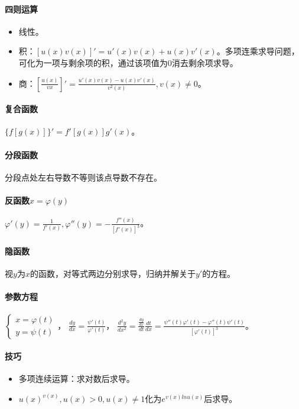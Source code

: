 \documentclass[
12pt, %
a4paper, 
oneside, %
headinclude,footinclude, %
]{scrartcl}
\begin{document}
\paragraph{四则运算}
\begin{itemize}
\item 线性。
\item 积：$ [u(x)v(x)]' = u'(x)v(x) + u(x)v'(x) $。多项连乘求导问题，
可化为一项与剩余项的积，通过该项值为$ 0 $消去剩余项求导。
\item 商：$ [\frac{u(x)}{v{x}}]' = \frac{u'(x)v(x) - u(x)v'(x)}{v^2(x)}, v(x) \neq 0 $。
\end{itemize}
\paragraph{复合函数}
$ \{f[g(x)]\}' = f'[g(x)]g'(x) $。
\paragraph{分段函数}
分段点处左右导数不等则该点导数不存在。
\paragraph{反函数$ x = \varphi (y) $}
$ \varphi '(y) = \frac{1}{f'(x)}, \varphi''(y) = -\frac{f''(x)}{[f'(x)]^3} $。
\paragraph{隐函数}
视$ y $为$ x $的函数，对等式两边分别求导，归纳并解关于$ y' $的方程。
\paragraph{参数方程}
$
\begin{cases}
x = \varphi (t) \\
y = \psi (t)
\end{cases}
$，
$ \frac{dy}{dx} = \frac{\psi' (t)}{\varphi' (t)} $，
$ \frac{d^2y}{dx^2} = \frac{\frac{dy}{dx}}{dt} \frac{dt}{dx} = \frac{\psi'' (t) \varphi' (t) - \varphi'' (t) \psi' (t)}{[\varphi' (t)]^3} $。
\paragraph{技巧}
\begin{itemize}
\item 多项连续运算：求对数后求导。
\item $ u(x)^{v(x)}, u(x) > 0, u(x) \neq 1 $化为$ e^{v(x)ln u(x)} $后求导。
\end{itemize}
\end{document}
